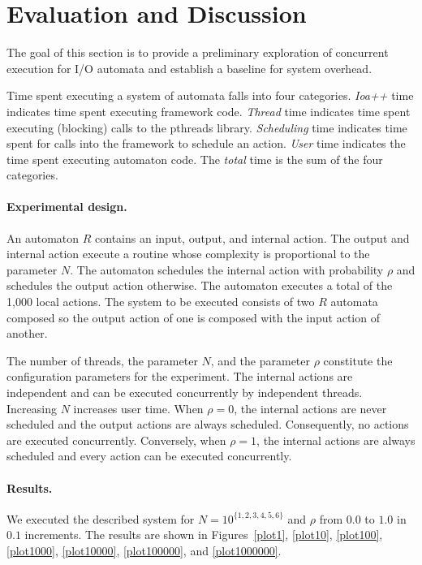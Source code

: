\section{Evaluation and Discussion\label{evaluation}}

The goal of this section is to provide a preliminary exploration of concurrent execution for I/O automata and establish a baseline for system overhead.

Time spent executing a system of automata falls into four categories.
\emph{Ioa++} time indicates time spent executing framework code.
\emph{Thread} time indicates time spent executing (blocking) calls to the pthreads library.
\emph{Scheduling} time indicates time spent for calls into the framework to schedule an action.
\emph{User} time indicates the time spent executing automaton code.
The \emph{total} time is the sum of the four categories.

\paragraph{Experimental design.}
An automaton $R$ contains an input, output, and internal action.
The output and internal action execute a routine whose complexity is proportional to the parameter $N$.
The automaton schedules the internal action with probability $\rho$ and schedules the output action otherwise.
The automaton executes a total of the 1,000 local actions.
The system to be executed consists of two $R$ automata composed so the output action of one is composed with the input action of another.

The number of threads, the parameter $N$, and the parameter $\rho$ constitute the configuration parameters for the experiment.
The internal actions are independent and can be executed concurrently by independent threads.
Increasing $N$ increases user time.
When $\rho = 0$, the internal actions are never scheduled and the output actions are always scheduled.
Consequently, no actions are executed concurrently.
Conversely, when $\rho = 1$, the internal actions are always scheduled and every action can be executed concurrently.

\paragraph{Results.}
We executed the described system for $N = 10^{\{1, 2, 3, 4, 5, 6\}}$ and $\rho$ from $0.0$ to $1.0$ in $0.1$ increments.
The results are shown in Figures~\ref{plot1}, \ref{plot10}, \ref{plot100}, \ref{plot1000}, \ref{plot10000}, \ref{plot100000}, and \ref{plot1000000}.


